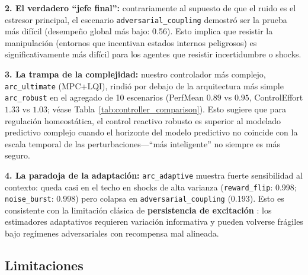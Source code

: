 \documentclass{article}
\begin{document}
\textbf{2. El verdadero ``jefe final'':} contrariamente al supuesto de que el ruido es el estresor principal, el escenario \texttt{adversarial\_coupling} demostró ser la prueba más difícil (desempeño global más bajo: 0.56). Esto implica que resistir la manipulación (entornos que incentivan estados internos peligrosos) es significativamente más difícil para los agentes que resistir incertidumbre o shocks.

\textbf{3. La trampa de la complejidad:} nuestro controlador más complejo, \texttt{arc\_ultimate} (MPC+LQI), rindió por debajo de la arquitectura más simple \texttt{arc\_robust} en el agregado de 10 escenarios (PerfMean $0.89$ vs $0.95$, ControlEffort $1.33$ vs $1.03$; véase Tabla~\ref{tab:controller_comparison}). Esto sugiere que para regulación homeostática, el control reactivo robusto es superior al modelado predictivo complejo cuando el horizonte del modelo predictivo no coincide con la escala temporal de las perturbaciones---``más inteligente'' no siempre es más seguro.

\textbf{4. La paradoja de la adaptación:} \texttt{arc\_adaptive} muestra fuerte sensibilidad al contexto: queda casi en el techo en shocks de alta varianza (\texttt{reward\_flip}: 0.998; \texttt{noise\_burst}: 0.998) pero colapsa en \texttt{adversarial\_coupling} (0.193). Esto es consistente con la limitación clásica de \textbf{persistencia de excitación} \cite{Astrom2008}: los estimadores adaptativos requieren variación informativa y pueden volverse frágiles bajo regímenes adversariales con recompensa mal alineada.

\subsection{Limitaciones}
\end{document}
